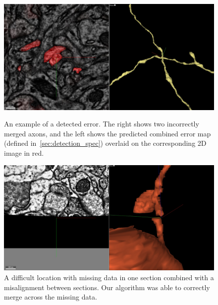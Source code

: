 \documentclass{article}
\begin{document}
\begin{figure}
	\begin{minipage}[t]{0.45\textwidth}
\begin{center}
	\includegraphics[width=1.0\linewidth]{x_error.jpg}
	\caption{An example of a detected error. The right shows two incorrectly merged axons, and the left shows the predicted combined error map (defined in~\ref{sec:detection_spec}) overlaid on the corresponding 2D image in red.}
	\label{fig:x_error}
\end{center}
\end{minipage}
\hfill
	\begin{minipage}[t]{0.45\textwidth}
\begin{center}
	\includegraphics[width=1.0\linewidth]{difficult.jpg}
	\caption{A difficult location with missing data in one section combined with a misalignment between sections. Our algorithm was able to correctly merge across the missing data.}
	\label{fig:difficult}
\end{center}
\end{minipage}
\end{figure}
\end{document}
